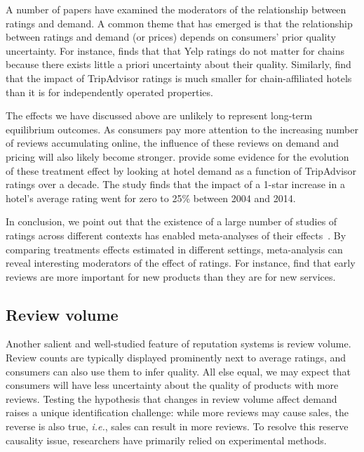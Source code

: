 \documentclass[letter,12pt]{article}
\begin{document}
A number of papers have examined the moderators of the relationship between
ratings and demand. A common theme that has emerged is that the relationship
between ratings and demand (or prices) depends on consumers' prior quality
uncertainty. For instance, \citet{luca2016reviews} finds that that Yelp
ratings do not matter for chains because there exists little a priori
uncertainty about their quality. Similarly, \citet{lewis2016welfare} find that
the impact of TripAdvisor ratings is much smaller for chain-affiliated hotels
than it is for independently operated properties.

The effects we have discussed above are unlikely to represent long-term
equilibrium outcomes. As consumers pay more attention to the increasing number
of reviews accumulating online, the influence of these reviews on demand and
pricing will also likely become stronger. \cite{lewis2016welfare} provide some
evidence for the evolution of these treatment effect by looking at hotel
demand as a function of TripAdvisor ratings over a decade. The study finds
that the impact of a 1-star increase in a hotel's average rating went for zero
to 25\% between 2004 and 2014.

In conclusion, we point out that the existence of a large number of studies of
ratings across different contexts has enabled meta-analyses of their
effects~\citep{floyd2014online,babic2016effect}. By comparing treatments
effects estimated in different settings, meta-analysis can reveal interesting
moderators of the effect of ratings. For instance, \cite{babic2016effect} find
that early reviews are more important for new products than they are for new
services.

\subsection{Review volume}

Another salient and well-studied feature of reputation systems is review
volume. Review counts are typically displayed prominently next to average
ratings, and consumers can also use them to infer quality. All else equal, we
may expect that consumers will have less uncertainty about the quality of
products with more reviews. Testing the hypothesis that changes in review
volume affect demand raises a unique identification challenge: while more
reviews may cause sales, the reverse is also true, \emph{i.e.}, sales can
result in more reviews. To resolve this reserve causality issue, researchers
have primarily relied on experimental methods.
\end{document}
